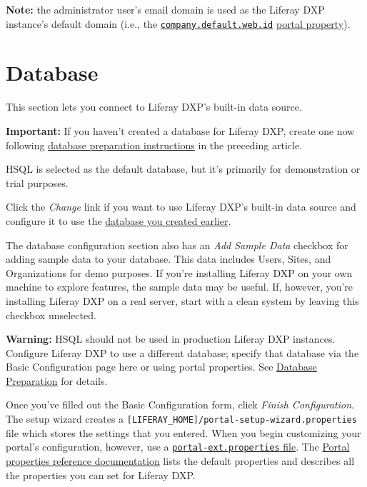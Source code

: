 \textbf{Note:} the administrator user's email domain is used as the
Liferay DXP instance's default domain (i.e., the
\href{@platform-ref@/7.2-latest/propertiesdoc/portal.properties.html\#Company}{\texttt{company.default.web.id}}
\href{/docs/7-2/deploy/-/knowledge_base/d/portal-properties}{portal
property}).

\noindent\hrulefill

\section{Database}\label{database}

This section lets you connect to Liferay DXP's built-in data source.

\noindent\hrulefill

\textbf{Important:} If you haven't created a database for Liferay DXP,
create one now following
\href{/docs/7-2/deploy/-/knowledge_base/d/preparing-for-install\#preparing-a-database}{database
preparation instructions} in the preceding article.

\noindent\hrulefill

HSQL is selected as the default database, but it's primarily for
demonstration or trial purposes.

Click the \emph{Change} link if you want to use Liferay DXP's built-in
data source and configure it to use the
\href{/docs/7-2/deploy/-/knowledge_base/d/preparing-for-install\#preparing-a-database}{database
you created earlier}.

The database configuration section also has an \emph{Add Sample Data}
checkbox for adding sample data to your database. This data includes
Users, Sites, and Organizations for demo purposes. If you're installing
Liferay DXP on your own machine to explore features, the sample data may
be useful. If, however, you're installing Liferay DXP on a real server,
start with a clean system by leaving this checkbox unselected.

\noindent\hrulefill

\textbf{Warning:} HSQL should not be used in production Liferay DXP
instances. Configure Liferay DXP to use a different database; specify
that database via the Basic Configuration page here or using portal
properties. See
\href{/docs/7-2/deploy/-/knowledge_base/d/preparing-for-install\#preparing-a-database}{Database
Preparation} for details.

\noindent\hrulefill

Once you've filled out the Basic Configuration form, click \emph{Finish
Configuration}. The setup wizard creates a
\texttt{{[}LIFERAY\_HOME{]}/portal-setup-wizard.properties} file which
stores the settings that you entered. When you begin customizing your
portal's configuration, however, use a
\href{/docs/7-2/deploy/-/knowledge_base/d/portal-properties}{\texttt{portal-ext.properties}
file}. The \href{@platform-ref@/7.2-latest/propertiesdoc}{Portal
properties reference documentation} lists the default properties and
describes all the properties you can set for Liferay DXP.

